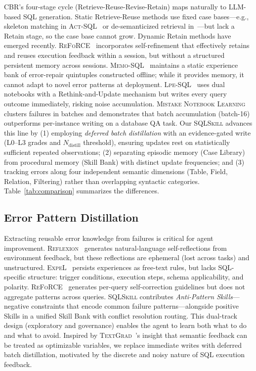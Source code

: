 CBR's four-stage cycle (Retrieve-Reuse-Revise-Retain) maps naturally to LLM-based SQL generation. 
Static Retrieve-Reuse methods use fixed case bases---e.g., skeleton matching in \textsc{Act-SQL}~\cite{actsql2023} or de-semanticized retrieval in~\cite{guo2023cbr}---but lack a Retain stage, so the case base cannot grow. Dynamic Retain methods have emerged recently. 
\textsc{ReFoRCE}~\cite{reforce2025} incorporates self-refinement that effectively retains and reuses execution feedback within a session, but without a structured persistent memory across sessions.
\textsc{Memo-SQL}~\cite{yang2026memosql} maintains a static experience bank of error-repair quintuples constructed offline; while it provides memory, it cannot adapt to novel error patterns at deployment. 
\textsc{Lpe-SQL}~\cite{chu2024lpesql} uses dual notebooks with a Rethink-and-Update mechanism but writes every query outcome immediately, risking noise accumulation. 
\textsc{Mistake Notebook Learning}~\cite{su2025mnl} clusters failures in batches and demonstrates that batch accumulation (batch-16) outperforms per-instance writing on a database QA task.
Our \textsc{SQLSkill} advances this line by (1) employing \emph{deferred batch distillation} with an evidence-gated write (L0--L3 grades and $N_{\text{distill}}$ threshold), ensuring updates rest on statistically sufficient repeated observations; (2) separating episodic memory (Case Library) from procedural memory (Skill Bank) with distinct update frequencies; and (3) tracking errors along four independent semantic dimensions (Table, Field, Relation, Filtering) rather than overlapping syntactic categories. Table~\ref{tab:comparison} summarizes the differences.

\subsection{Error Pattern Distillation}
\label{subsec:distillation}

Extracting reusable error knowledge from failures is critical for agent improvement. \textsc{Reflexion}~\cite{shinn2023reflexion} generates natural-language self-reflections from environment feedback, but these reflections are ephemeral (lost across tasks) and unstructured. \textsc{ExpeL}~\cite{zhao2023expel} persists experiences as free-text rules, but lacks SQL-specific structure: trigger conditions, execution steps, schema applicability, and polarity. \textsc{ReFoRCE}~\cite{reforce2025} generates per-query self-correction guidelines but does not aggregate patterns across queries. \textsc{SQLSkill} contributes \emph{Anti-Pattern Skills}---negative constraints that encode common failure patterns---alongside positive Skills in a unified Skill Bank with conflict resolution routing. This dual-track design (exploratory and governance) enables the agent to learn both what to do and what to avoid. Inspired by \textsc{TextGrad}~\cite{yuksekgonul2024textgrad}'s insight that semantic feedback can be treated as optimizable variables, we replace immediate writes with deferred batch distillation, motivated by the discrete and noisy nature of SQL execution feedback.

